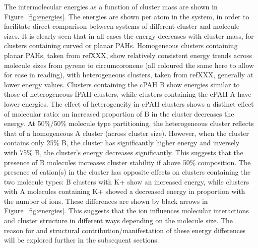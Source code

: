 The intermolecular energies as a function of cluster mass are shown in Figure~\ref{fig:energies}.  The energies are shown per atom in the system, in order to facilitate direct comparison between systems of different cluster and molecule sizes.
It is clearly seen that in all cases the energy decreases with cluster mass, for clusters containing curved or planar PAHs.  Homogeneous clusters containing planar PAHs, taken from refXXX, show relatively consistent energy trends across molecule sizes from pyrene to circumcoronene (all coloured the same here to allow for ease in reading), with heterogeneous clusters, taken from refXXX, generally at lower energy values.  Clusters containing the cPAH B show energies similar to those of heterogeneous fPAH clusters, while clusters containing the cPAH A have lower energies.
The effect of heterogeneity in cPAH clusters shows a distinct effect of molecular ratio: an increased proportion of B in the cluster decreases the energy. At 50\%/50\% molecule type partitioning, the heterogeneous cluster reflects that of a homogeneous A cluster (across cluster size). However, when the cluster contains only 25\% B, the cluster has significantly higher energy and inversely with 75\% B, the cluster's energy decreases significantly.  This suggests that the presence of B molecules increases cluster stability if above 50\% composition.
The presence of cation(s) in the cluster has opposite effects on clusters containing the two molecule types: B clusters with K+ show an increased energy, while clusters with A molecules containing K+ showed a decreased energy in proportion with the number of ions.  These differences are shown by black arrows in Figure~\ref{fig:energies}. This suggests that the ion influences molecular interactions and cluster structure in different ways depending on the molecule size.
The reason for and structural contribution/manifestation of these energy differences will be explored further in the subsequent sections.

